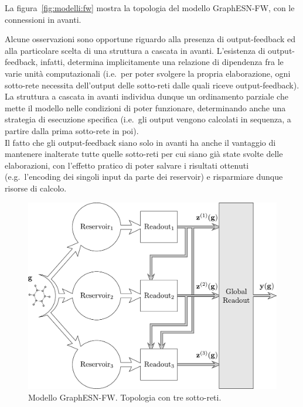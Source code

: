 La figura~\vref{fig:modelli:fw} mostra la topologia del modello GraphESN-FW, con le connessioni in avanti.

Alcune osservazioni sono opportune riguardo alla presenza di output-feedback ed alla particolare scelta di una struttura a cascata in avanti. L'esistenza di output-feedback, infatti, determina implicitamente una relazione di dipendenza fra le varie unità computazionali (i.e.\ per poter svolgere la propria elaborazione, ogni sotto-rete necessita dell'output delle sotto-reti dalle quali riceve output-feedback). La struttura a cascata in avanti individua dunque un ordinamento parziale che mette il modello nelle condizioni di poter funzionare, determinando anche una strategia di esecuzione specifica (i.e.\ gli output vengono calcolati in sequenza, a partire dalla prima sotto-rete in poi).\\
Il fatto che gli output-feedback siano solo in avanti ha anche il vantaggio di mantenere inalterate tutte quelle sotto-reti per cui siano già state svolte delle elaborazioni, con l'effetto pratico di poter salvare i risultati ottenuti (e.g.\ l'encoding dei singoli input da parte dei reservoir) e risparmiare dunque risorse di calcolo.

\begin{figure}[p]
\centering
\includegraphics[width=0.8\columnwidth]{img/Modello-FW}
\medskip
\caption[GraphESN-FW.]{Modello GraphESN-FW. Topologia con tre sotto-reti.}
\label{fig:modelli:fw}
\end{figure}

